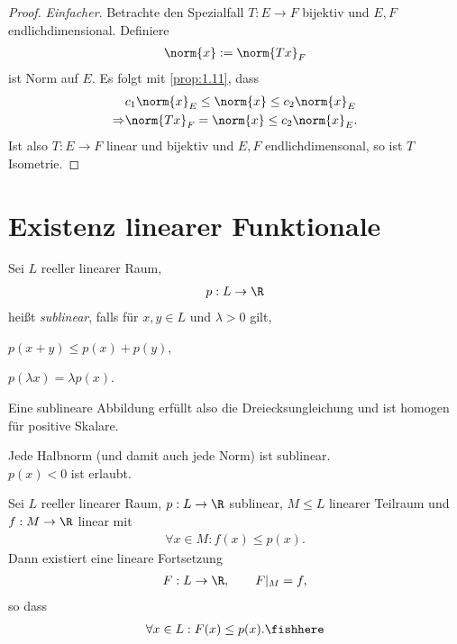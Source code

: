 \begin{proof}
\textit{Einfacher}. Betrachte den Spezialfall $T: E\to F$ bijektiv und $E,F$
endlichdimensional. Definiere
\begin{align*}
\norm{x}:=\norm{Tx}_F
\end{align*}
ist Norm auf $E$. Es folgt mit \ref{prop:1.11}, dass
\begin{align*}
&c_1\norm{x}_E \le \norm{x}\le c_2\norm{x}_E\\
\Rightarrow & \norm{Tx}_F = \norm{x} \le c_2 \norm{x}_E.
\end{align*}
Ist also $T:E\to F$ linear und bijektiv und $E,F$ endlichdimensonal, so ist
$T$ Isometrie.\qedhere
\end{proof}

\section{Existenz linearer Funktionale}

\begin{defn}
\label{defn:4.6}
Sei $L$ reeller linearer Raum,
\begin{align*}
p : L\to\R
\end{align*}
heißt \emph{sublinear}, falls für $x,y\in L$ und
$\lambda > 0$ gilt,
\begin{defnenum}
  \item $p(x+y)\le p(x)+p(y)$,
  \item $p(\lambda x) = \lambda p(x)$.\fishhere
\end{defnenum}
\end{defn}

Eine sublineare Abbildung erfüllt also die Dreiecksungleichung und ist homogen
für positive Skalare.

\begin{bem}
\label{bem:4.7}
Jede Halbnorm (und damit auch jede Norm) ist sublinear.\\
$p(x) < 0$ ist erlaubt.\maphere
\end{bem}

\begin{prop}
\label{prop:4.8}
Sei $L$ reeller linearer Raum, $p:L\to\R$ sublinear, $M\le L$ linearer
Teilraum und $f: M\to \R$ linear mit
\begin{align*}
\forall x\in M : f(x)\le p(x).
\end{align*}
Dann existiert eine lineare Fortsetzung
\begin{align*}
F: L\to\R,\qquad F|_M = f,
\end{align*}
so dass
\begin{align*}
\forall x\in L : F(x)\le p(x).\fishhere
\end{align*}
\end{prop}

